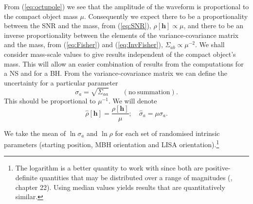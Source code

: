 \documentclass[useAMS,usedcolumn,usegraphicx,usenatbib]{mn2e}
\newcommand{\eqnref}[1]{(\ref{eq:#1})}
\begin{document}
From \eqnref{octupole} we see that the amplitude of the waveform is proportional to the compact object mass $\mu$. Consequently we expect there to be a proportionality between the SNR and the mass, from \eqnref{SNR}, $\rho[\boldsymbol{h}] \propto \mu$, and there to be an inverse proportionality between the elements of the variance-covariance matrix and the mass, from \eqnref{Fisher} and \eqnref{InvFisher}, $\Sigma_{ab} \propto \mu^{-2}$. We shall consider mass-scale values to give results independent of the compact object's mass. This will allow an easier combination of results from the computations for a NS and for a BH. From the variance-covariance matrix we can define the uncertainty for a particular parameter
\begin{equation}
\sigma_a = \sqrt{\Sigma_{aa}} \qquad \mathrm{(no\ summation)}.
\end{equation}
This should be proportional to $\mu^{-1}$. We will denote
\begin{equation}
\hat{\rho}[\boldsymbol{h}] = \frac{\rho[\boldsymbol{h}]}{\mu}; \quad \hat{\sigma}_a = \mu\sigma_a.
\end{equation}

We take the mean of $\ln \sigma_a$ and $\ln \rho$ for each set of randomised intrinsic parameters (starting position, MBH orientation and LISA orientation).\footnote{The logarithm is a better quantity to work with since both are positive-definite quantities that may be distributed over a range of magnitudes (\citealt{Mackay2003}, chapter 22). Using median values yields results that are quantitatively similar.}
\end{document}
